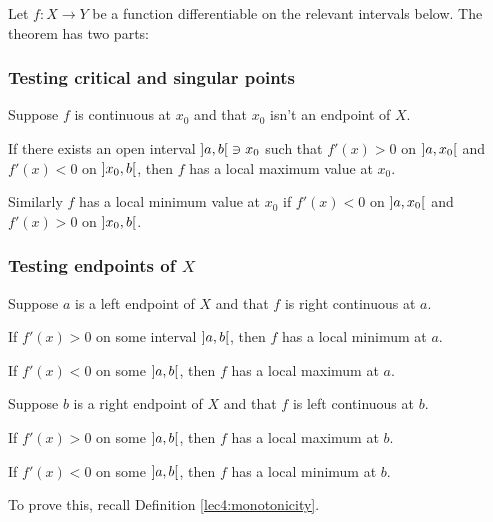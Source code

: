 \begin{theorem}
	Let $f \colon X \to Y$ be a function differentiable on the relevant intervals below.
	The theorem has two parts:

	\subsubsection*{Testing critical and singular points}

	Suppose $f$ is continuous at $x_0$ and that $x_0$ isn't an endpoint of $X$.
	\begin{romanlist}
		\item If there exists an open interval $\interval[open]{a}{b} \ni x_0$ such that $f'(x) > 0$ on $\interval[open]{a}{x_0}$ and $f'(x) < 0$ on $\interval[open]{x_0}{b}$, then $f$ has a local maximum value at $x_0$.
		\item Similarly $f$ has a local minimum value at $x_0$ if $f'(x) < 0$ on $\interval[open]{a}{x_0}$ and $f'(x) > 0$ on $\interval[open]{x_0}{b}$.
	\end{romanlist}

	\subsubsection*{Testing endpoints of $X$}

	Suppose $a$ is a left endpoint of $X$ and that $f$ is right continuous at $a$.
	\begin{romanlist}
		\setcounter{enumi}{2}
		\item If $f'(x) > 0$ on some interval $\interval[open]{a}{b}$, then $f$ has a local minimum at $a$.
		\item If $f'(x) < 0$ on some $\interval[open]{a}{b}$, then $f$ has a local maximum at $a$.
	\end{romanlist}
	Suppose $b$ is a right endpoint of $X$ and that $f$ is left continuous at $b$.
	\begin{romanlist}
		\setcounter{enumi}{4}
		\item If $f'(x) > 0$ on some $\interval[open]{a}{b}$, then $f$ has a local maximum at $b$.
		\item If $f'(x) < 0$ on some $\interval[open]{a}{b}$, then $f$ has a local minimum at $b$.
	\end{romanlist}
\end{theorem}

\begin{exercise}
	To prove this, recall Definition \ref{lec4:monotonicity}.
\end{exercise}


